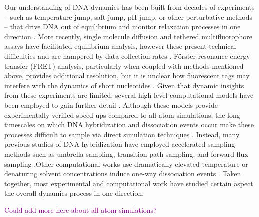 \documentclass[journal=jpcbfk,manuscript=article]{achemso}
\begin{document}
Our understanding of DNA dynamics has been built from decades of experiments -- such as temperature-jump, salt-jump, pH-jump, or other perturbative methods -- that drive DNA out of equilibrium and monitor relaxation processes in one direction \citep{Morrison1993SensitiveSolution, Wetmur1968KineticsDNA, Craig1971ElaxationOligon, Porschke1973ThermodynamicsPairs, Williams1989LaserDGCATGC, Narayanan2012ExploringMixing, Chen2007InfluenceHybridization, Sanstead2018DirectDehybridization}. More recently, single molecule diffusion and tethered multifluorophore assays have facilitated equilibrium analysis, however these present technical difficulties and are hampered by data collection rates \citep{Liu20173DSolution,  Schickinger2018TetheredHelices, Chen2008Base-by-baseSpectroscopy, Dupuis2013Single-moleculeHelices}. Förster resonance energy transfer (FRET) analysis, particularly when coupled with methods mentioned above, provides additional resolution, but it is unclear how fluorescent tags may interfere with the dynamics of short nucleotides \citep{Morrison1993SensitiveSolution}. Given that dynamic insights from these experiments are limited, several high-level computational models have been employed to gain further detail \citep{Romano2013DNADependence, Hinckley2013AnHybridization, Maciejczyk2014DNAModel, Markegard2015}. Although these models provide experimentally verified speed-ups compared to all atom simulations, the long timescales on which DNA hybridization and dissociation events occur make these processes difficult to sample via direct simulation techniques \citep{Phys2014}. Instead, many previous studies of DNA hybridization have employed accelerated sampling methods such as umbrella sampling,  transition path sampling, and forward flux sampling \citep{Schmitt2013ExploringSurface, Sambriski2009,  Hoefert2011MolecularOligonucleotides, Romano2013DNADependence}.Other computational works use dramatically elevated temperature or denaturing solvent concentrations induce one-way dissociation events \citep{Wong2008TheSimulations, Perez2010Real-timeUnfolding}. Taken together, most experimental and computational work have studied certain aspect the overall dynamics process in one direction.

\textcolor{purple}{Could add more here about all-atom simulations?} 
\end{document}
